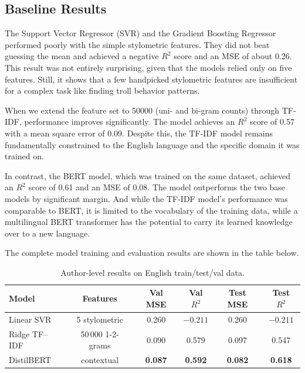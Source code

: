 \documentclass[twoside]{ctuthesis}
\theoremstyle{plain}
\theoremstyle{definition}
\theoremstyle{note}
\begin{document}
\subsection{Baseline Results}

The Support Vector Regressor (SVR) and the Gradient Boosting Regressor performed poorly with the simple stylometric features. They did not beat guessing the mean and achieved a negative $R^2$ score and an MSE of about 0.26. This result was not entirely surprising, given that the models relied only on five features. Still, it shows that a few handpicked stylometric features are insufficient for a complex task like finding troll behavior patterns.\par
When we extend the feature set to 50000 (uni- and bi-gram counts) through TF-IDF, performance improves significantly. The model achieves an $R^2$ score of 0.57 with a mean square error of 0.09. Despite this, the TF-IDF model remains fundamentally constrained to the English language and the specific domain it was trained on.\par
In contrast, the BERT model, which was trained on the same dataset, achieved an $R^2$ score of 0.61 and an MSE of 0.08. The model outperforms the two base models by significant margin. And while the TF-IDF model's performance was comparable to BERT, it is limited to the vocabulary of the training data, while a multilingual BERT transformer has the potential to carry its learned knowledge over to a new language.\par
The complete model training and evaluation results are shown in the table below.\par

\begin{table}[ht]
  \centering
  \caption{Author-level results on English train/test/val data.}
  \label{tab:en_author_results}
  \begin{tabular}{lccccc}
   \hline
   \textbf{Model} & \textbf{Features} &
   \textbf{Val MSE} & \textbf{Val $R^{2}$} &
   \textbf{Test MSE} & \textbf{Test $R^{2}$} \\
   \hline
 Linear SVR & 5 stylometric     & 0.260 & $-0.211$ & 0.260 & $-0.211$ \\
 Ridge TF--IDF & 50\,000 1-2-grams  & 0.090 & 0.579  & 0.097 & 0.547  \\
 DistilBERT & contextual  & \textbf{0.087} & \textbf{0.592} &
                     \textbf{0.082} & \textbf{0.618} \\
   \hline
  \end{tabular}
\end{table}
\end{document}
